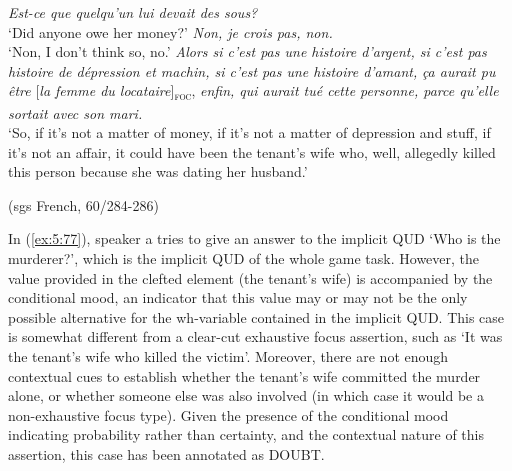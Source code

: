  \ea \label{ex:5:77}
\ea \textit{Est-ce que quelqu'un lui devait des sous?}\\
 `Did anyone owe her money?'
\ex \textit{Non, je crois pas, non.}\\    
`Non, I don't think so, no.'
 \textit{Alors  si c'est pas une histoire d'argent, si c'est pas histoire de  dépression et machin, si c'est pas une histoire d'amant}\textit{,} \textit{ça aurait pu être} {[\textit{la femme du locataire}]\textsubscript{\textsc{foc}}}\normalsize, \textit{enfin, qui aurait tué cette personne, parce qu'elle sortait avec son mari.}\\
`So, if it's not a matter of money, if it's not a matter of depression and stuff, if it's not an affair, it could have been the tenant's wife who, well, allegedly killed this person because she was dating her husband.' 

\hfill (sgs French, 60/284-286)        
\z \z


In (\ref{ex:5:77}), speaker a tries to give an answer to the implicit QUD `Who is the murderer?', which is the implicit QUD of the whole game task. However, the value provided in the clefted element (the tenant's wife) is accompanied by the conditional mood, an indicator that this value may or may not be the only possible alternative for the wh-variable contained in the implicit QUD. This case is somewhat different from a clear-cut exhaustive focus assertion, such as `It was the tenant's wife who killed the victim'. Moreover, there are not enough contextual cues to establish whether the tenant's wife committed the murder alone, or whether someone else was also involved (in which case it would be a non-exhaustive focus type). Given the presence of the conditional mood indicating probability rather than certainty, and the contextual nature of this assertion, this case has been annotated as {\selectfont DOUBT}.

	 


